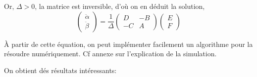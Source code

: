 \documentclass[10pt]{article}
\begin{document}
Or, $\Delta > 0$, la matrice est inversible, d'où on en déduit la solution,
\begin{equation}
\begin{pmatrix}
\ddot{\alpha} \\ \ddot{\beta}
\end{pmatrix}
=
\frac{1}{\Delta}
\begin{pmatrix}
D & -B \\ -C & A
\end{pmatrix}
\begin{pmatrix}
E \\ F 
\end{pmatrix}
\end{equation}

À partir de cette équation, on peut implémenter facilement un algorithme pour la résoudre numériquement.
Cf annexe sur l'explication de la simulation.

On obtient dés résultats intéressants:
\end{document}
